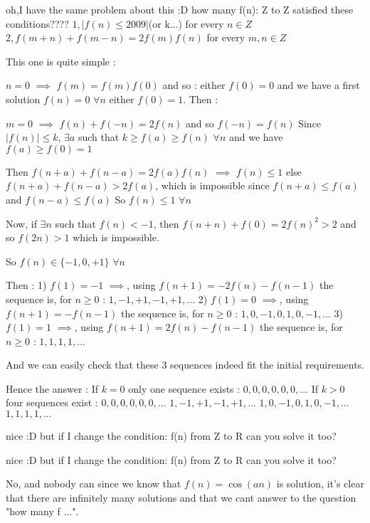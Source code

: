 \begin{solution}
	\begin{tcolorbox}oh,I have the same problem about this :D
how many f(n): Z to Z
satisfied these conditions????
$ 1,|f(n)\le 2009|$(or k...) for every $ n \in Z$
$ 2,f(m + n) + f(m - n) = 2f(m)f(n)$ for every $ m,n \in Z$\end{tcolorbox}
This one is quite simple :

$ n=0$ $ \implies$ $ f(m)=f(m)f(0)$ and so :
either $ f(0)=0$ and we have a first solution $ f(n)=0$ $ \forall n$
either $ f(0)=1$. Then :

$ m=0$ $ \implies$ $ f(n)+f(-n)=2f(n)$ and so $ f(-n)=f(n)$
Since $ |f(n)|\le k$, $ \exists a$ such that $ k\geq f(a)\geq f(n)$ $ \forall n$ and we have $ f(a)\geq f(0)=1$

Then $ f(n+a)+f(n-a)=2f(a)f(n)$ $ \implies$ $ f(n)\leq 1$ else $ f(n+a)+f(n-a)>2f(a)$, which is impossible since $ f(n+a)\leq f(a)$ and $ f(n-a)\leq f(a)$
So $ f(n)\leq 1$ $ \forall n$

Now, if $ \exists n$ such that $ f(n)<-1$, then $ f(n+n)+f(0)=2f(n)^2>2$ and so $ f(2n)>1$ which is impossible.

So $ f(n)\in\{-1,0,+1\}$ $ \forall n$

Then :
1) $ f(1)=-1$ $ \implies$, using $ f(n+1)=-2f(n)-f(n-1)$ the sequence is, for $ n\geq 0$ : $ 1,-1,+1,-1,+1, ...$
2) $ f(1)=0$ $ \implies$, using $ f(n+1)=-f(n-1)$ the sequence is, for $ n\geq 0$ : $ 1,0,-1,0,1, 0, -1, ...$
3) $ f(1)=1$ $ \implies$, using $ f(n+1)=2f(n)-f(n-1)$ the sequence is, for $ n\geq 0$ : $ 1, 1, 1, 1, ...$

And we can easily check that these 3 sequences indeed fit the initial requirements.

Hence the answer :
If $ k=0$ only one sequence exists : $ 0, 0, 0, 0, 0, 0, ...$
If $ k>0$ four sequences exist :
$ 0, 0, 0, 0, 0, 0, ...$
$ 1,-1,+1,-1,+1, ...$
$ 1,0,-1,0,1, 0, -1, ...$
$ 1, 1, 1, 1, ...$
\end{solution}



\begin{solution}
	nice :D
but if I change the condition:
f(n) from Z to R
can you solve it too?
\end{solution}



\begin{solution}
	\begin{tcolorbox}nice :D
but if I change the condition:
f(n) from Z to R
can you solve it too?\end{tcolorbox}

No, and nobody can since we know that $ f(n)=\cos(an)$ is solution, it's clear that there are infinitely many solutions and that we cant answer to the question  "how many f ...".
\end{solution}



